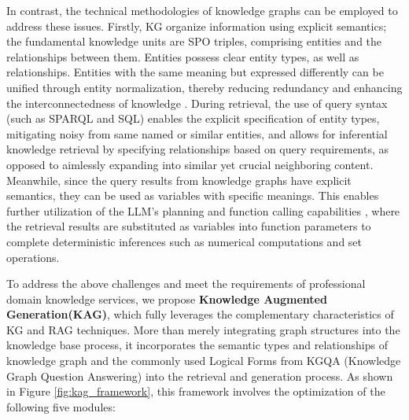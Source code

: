 \documentclass{article}
\begin{document}
In contrast, the technical methodologies of knowledge graphs can be employed to address these issues. Firstly, KG organize information using explicit semantics; the fundamental knowledge units  are SPO triples, comprising entities and the relationships between them\cite{Paulheim2016KnowledgeGR}. Entities possess clear entity types, as well as relationships. Entities with the same meaning but expressed differently can be unified through entity normalization, thereby reducing redundancy and enhancing the interconnectedness of knowledge \cite{nodeclustering}. During retrieval, the use of query syntax (such as SPARQL\cite{nl2sparql} and SQL\cite{nl2sql}) enables the explicit specification of entity types, mitigating noisy from same named or similar entities, and allows for inferential knowledge retrieval by specifying relationships based on query requirements, as opposed to aimlessly expanding into similar yet crucial neighboring content. Meanwhile, since the query results from knowledge graphs have explicit semantics, they can be used as variables with specific meanings. This enables further utilization of the LLM's planning and function calling capabilities \cite{react}, where the retrieval results are substituted as variables into function parameters to complete deterministic inferences such as numerical computations and set operations.

To address the above challenges and meet the requirements of professional domain knowledge services, we propose \textbf{Knowledge Augmented Generation(KAG)}, which fully leverages the complementary characteristics of KG and RAG techniques. More than merely integrating graph structures into the knowledge base process, it incorporates the semantic types and relationships of knowledge graph and the commonly used Logical Forms from KGQA (Knowledge Graph Question Answering) into the retrieval and generation process. As shown in Figure \ref{fig:kag_framework}, this framework involves the optimization of the following five modules:
\end{document}
